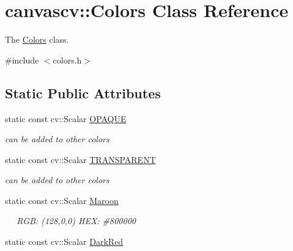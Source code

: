 \hypertarget{classcanvascv_1_1Colors}{}\section{canvascv\+:\+:Colors Class Reference}
\label{classcanvascv_1_1Colors}


The \hyperlink{classcanvascv_1_1Colors}{Colors} class.  




{\ttfamily \#include $<$colors.\+h$>$}

\subsection*{Static Public Attributes}
\begin{DoxyCompactItemize}
\item 
static const cv\+::\+Scalar \hyperlink{classcanvascv_1_1Colors_a8ce831ec6123adb0a5504fc515f15c72}{O\+P\+A\+Q\+UE}\hypertarget{classcanvascv_1_1Colors_a8ce831ec6123adb0a5504fc515f15c72}{}\label{classcanvascv_1_1Colors_a8ce831ec6123adb0a5504fc515f15c72}

\begin{DoxyCompactList}\small\item\em can be added to other colors \end{DoxyCompactList}\item 
static const cv\+::\+Scalar \hyperlink{classcanvascv_1_1Colors_afcf2e7359a45b54affb1d2c4df47730f}{T\+R\+A\+N\+S\+P\+A\+R\+E\+NT}\hypertarget{classcanvascv_1_1Colors_afcf2e7359a45b54affb1d2c4df47730f}{}\label{classcanvascv_1_1Colors_afcf2e7359a45b54affb1d2c4df47730f}

\begin{DoxyCompactList}\small\item\em can be added to other colors \end{DoxyCompactList}\item 
static const cv\+::\+Scalar \hyperlink{classcanvascv_1_1Colors_acb99327f0cf205bd37f5687d89ddec20}{Maroon}\hypertarget{classcanvascv_1_1Colors_acb99327f0cf205bd37f5687d89ddec20}{}\label{classcanvascv_1_1Colors_acb99327f0cf205bd37f5687d89ddec20}

\begin{DoxyCompactList}\small\item\em ~~ R\+GB\+: (128,0,0) H\+EX\+: \#800000 \end{DoxyCompactList}\item 
static const cv\+::\+Scalar \hyperlink{classcanvascv_1_1Colors_a29a1cd16453b2d75bdb4324b395f2796}{Dark\+Red}\hypertarget{classcanvascv_1_1Colors_a29a1cd16453b2d75bdb4324b395f2796}{}\label{classcanvascv_1_1Colors_a29a1cd16453b2d75bdb4324b395f2796}


\end{DoxyCompactItemize}
